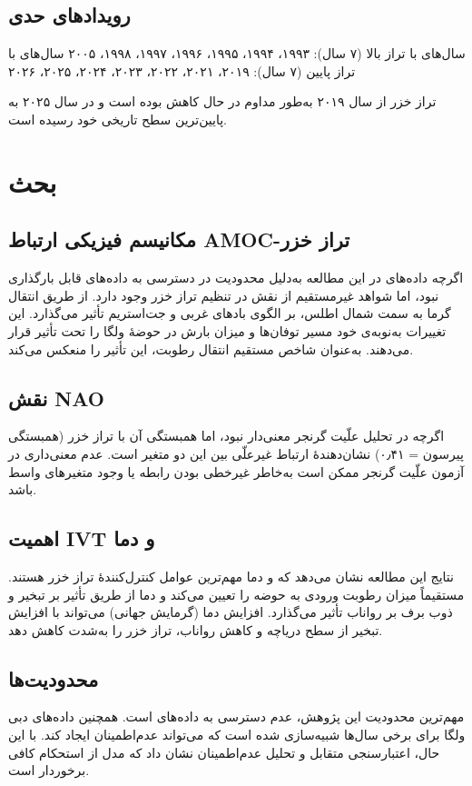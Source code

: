 \documentclass[12pt,a4paper]{article}
\begin{document}
\subsection{رویدادهای حدی}
سال‌های با تراز بالا (۷ سال): ۱۹۹۳، ۱۹۹۴، ۱۹۹۵، ۱۹۹۶، ۱۹۹۷، ۱۹۹۸، ۲۰۰۵  
سال‌های با تراز پایین (۷ سال): ۲۰۱۹، ۲۰۲۱، ۲۰۲۲، ۲۰۲۳، ۲۰۲۴، ۲۰۲۵، ۲۰۲۶

تراز خزر از سال ۲۰۱۹ به‌طور مداوم در حال کاهش بوده است و در سال ۲۰۲۵ به پایین‌ترین سطح تاریخی خود رسیده است.

\section{بحث}
\subsection{مکانیسم فیزیکی ارتباط AMOC-تراز خزر}
اگرچه داده‌های  در این مطالعه به‌دلیل محدودیت در دسترسی به داده‌های  قابل بارگذاری نبود، اما شواهد غیرمستقیم از نقش  در تنظیم تراز خزر وجود دارد.  از طریق انتقال گرما به سمت شمال اطلس، بر الگوی بادهای غربی و جت‌استریم تأثیر می‌گذارد. این تغییرات به‌نوبه‌ی خود مسیر توفان‌ها و میزان بارش در حوضهٔ ولگا را تحت تأثیر قرار می‌دهند.  به‌عنوان شاخص مستقیم انتقال رطوبت، این تأثیر را منعکس می‌کند.

\subsection{نقش NAO}
اگرچه  در تحلیل علّیت گرنجر معنی‌دار نبود، اما همبستگی آن با تراز خزر (همبستگی پیرسون = ۰٫۴۱) نشان‌دهندهٔ ارتباط غیرعلّی بین این دو متغیر است. عدم معنی‌داری در آزمون علّیت گرنجر ممکن است به‌خاطر غیرخطی بودن رابطه یا وجود متغیرهای واسط باشد.

\subsection{اهمیت IVT و دما}
نتایج این مطالعه نشان می‌دهد که  و دما مهم‌ترین عوامل کنترل‌کنندهٔ تراز خزر هستند.  مستقیماً میزان رطوبت ورودی به حوضه را تعیین می‌کند و دما از طریق تأثیر بر تبخیر و ذوب برف بر رواناب تأثیر می‌گذارد. افزایش دما (گرمایش جهانی) می‌تواند با افزایش تبخیر از سطح دریاچه و کاهش رواناب، تراز خزر را به‌شدت کاهش دهد.

\subsection{محدودیت‌ها}
مهم‌ترین محدودیت این پژوهش، عدم دسترسی به داده‌های  است. همچنین داده‌های دبی ولگا برای برخی سال‌ها شبیه‌سازی شده است که می‌تواند عدم‌اطمینان ایجاد کند. با این حال، اعتبارسنجی متقابل و تحلیل عدم‌اطمینان نشان داد که مدل از استحکام کافی برخوردار است.
\end{document}
